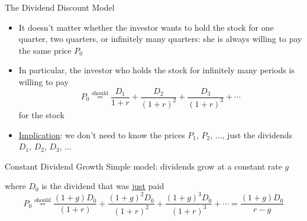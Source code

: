 \documentclass{beamer}
\newcommand{\should}{\overset{\text{should}}{=}}
\begin{document}
\begin{frame}{The Dividend Discount Model}
	\begin{itemize}
		\item It doesn't matter whether the investor wants to hold the stock for one quarter, two quarters, or infinitely many quarters: she is always willing to pay the same price $P_{0}$
		\item In particular, the investor who holds the stock for infinitely many periods is willing to pay 
		\begin{equation*}
			P_{0}\should\frac{D_{1}}{1+r}+\frac{D_{2}}{(1+r)^2}+\frac{D_{3}}{(1+r)^3}+\cdots 
		\end{equation*}
		for the stock
		\item \underline{Implication}: we don't need to know the prices $P_{1}$, $P_{2}$, $\ldots$, just the dividends $D_{1}$, $D_{2}$, $D_{3}$, $\ldots$
	\end{itemize}
\end{frame}

\begin{frame}{Constant Dividend Growth}
Simple model: dividends grow at a constant rate $g$ 
\begin{figure}[H]
	\begin{center}
	\end{center}
\end{figure}
where $D_{0}$ is the dividend that was \underline{just} paid
\begin{equation*}
	P_{0}\should\frac{(1+g)D_{0}}{(1+r)}+\frac{(1+g)^{2}D_{0}}{(1+r)^2}+\frac{(1+g)^{3}D_{0}}{(1+r)^3}+\cdots=\frac{(1+g)D_{0}}{r-g}
\end{equation*}
\end{frame}
\end{document}
